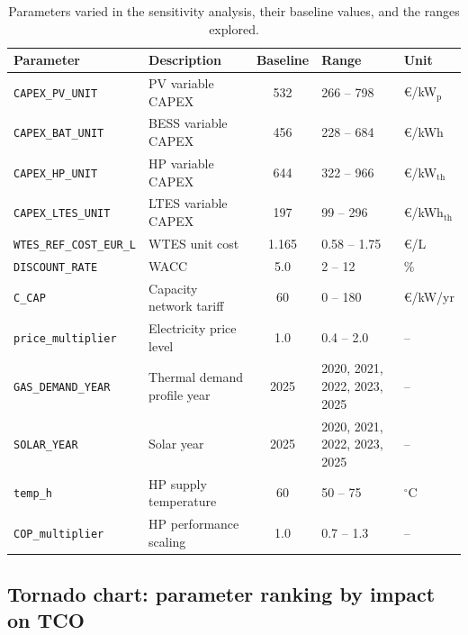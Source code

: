 \documentclass[11pt,a4paper]{report}
\begin{document}
\begin{table}[H]
\centering
\caption{Parameters varied in the sensitivity analysis, their baseline values,
         and the ranges explored.}
\label{tab:sens_params}
\begin{tabular}{llcll}
\hline
\textbf{Parameter} & \textbf{Description} & \textbf{Baseline} & \textbf{Range} & \textbf{Unit} \\
\hline
\texttt{CAPEX\_PV\_UNIT}      & PV variable CAPEX          & 532   & 266 -- 798    & \euro/kW$_\mathrm{p}$ \\
\texttt{CAPEX\_BAT\_UNIT}     & BESS variable CAPEX        & 456   & 228 -- 684    & \euro/kWh \\
\texttt{CAPEX\_HP\_UNIT}      & HP variable CAPEX        & 644   & 322 -- 966    & \euro/kW$_\mathrm{th}$ \\
\texttt{CAPEX\_LTES\_UNIT}    & LTES variable CAPEX        & 197   & 99 -- 296     & \euro/kWh$_\mathrm{th}$ \\
\texttt{WTES\_REF\_COST\_EUR\_L} & WTES unit cost          & 1.165 & 0.58 -- 1.75  & \euro/L \\
\texttt{DISCOUNT\_RATE}       & WACC                       & 5.0   & 2 -- 12       & \% \\
\texttt{C\_CAP}               & Capacity network tariff    & 60    & 0 -- 180      & \euro/kW/yr \\
\texttt{price\_multiplier}    & Electricity price level    & 1.0   & 0.4 -- 2.0    & -- \\
\texttt{GAS\_DEMAND\_YEAR}    & Thermal demand profile year  & 2025  & 2020, 2021, 2022, 2023, 2025 & -- \\
\texttt{SOLAR\_YEAR}       & Solar year   & 2025  & 2020, 2021, 2022, 2023, 2025 & -- \\
\texttt{temp\_h}              & HP supply temperature      & 60    & 50 -- 75      & $^\circ$C \\
\texttt{COP\_multiplier}      & HP performance scaling     & 1.0   & 0.7 -- 1.3    & -- \\
\hline
\end{tabular}
\end{table}

\subsection{Tornado chart: parameter ranking by impact on TCO}
\label{sub:sens_tornado}
\end{document}
